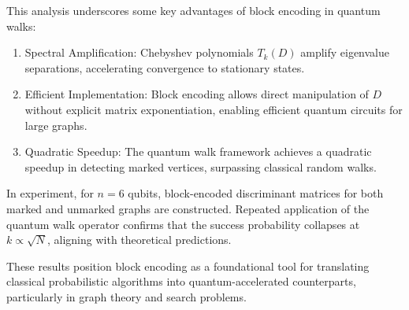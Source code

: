 \documentclass{article}
\begin{document}
This analysis underscores some key advantages of block encoding in quantum walks:

\begin{enumerate}
  \item Spectral Amplification: Chebyshev polynomials $ T_k(D) $ amplify eigenvalue separations, accelerating convergence to stationary states.
  \item Efficient Implementation: Block encoding allows direct manipulation of $ D $ without explicit matrix exponentiation, enabling efficient quantum circuits for large graphs.
  \item Quadratic Speedup: The quantum walk framework achieves a quadratic speedup in detecting marked vertices, surpassing classical random walks.
\end{enumerate}

In experiment, for $ n = 6 $ qubits, block-encoded discriminant matrices for both marked and unmarked graphs are constructed. Repeated application of the quantum walk operator confirms that the success probability collapses at $ k \propto \sqrt{N} $, aligning with theoretical predictions.

These results position block encoding as a foundational tool for translating classical probabilistic algorithms into quantum-accelerated counterparts, particularly in graph theory and search problems.



\end{document}
